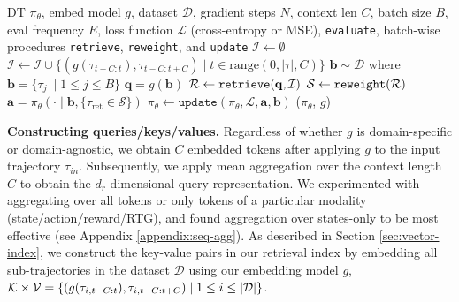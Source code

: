 \documentclass{article}
\newcommand{\cI}{\mathcal{I}} \newcommand{\cJ}{\mathcal{J}}
\newcommand{\cK}{\mathcal{K}} \newcommand{\cL}{\mathcal{L}}
\begin{document}
\begin{algorithm}[H]
\caption{RA-DT at training time}
\label{alg:radt-train}
  \begin{algorithmic}[1]
    \REQUIRE DT $\pi_{\theta}$, embed model $g$, dataset $\mathcal{D}$, gradient steps $N$, context len $C$, batch size $B$, eval frequency $E$, loss function $\mathcal{L}$ (cross-entropy or MSE), \texttt{evaluate}, batch-wise procedures \texttt{retrieve}, \texttt{reweight}, and \texttt{update}
    \STATE $\mathcal{I} \gets \emptyset$ \hfill{}
        \STATE $\mathcal{I} \gets \mathcal{I} \cup \{(g(\tau_{t-C:t}), \tau_{t-C:t+C}) \mid t \in \text{range}(0, |\tau|, C)\}$ \hfill\COMMENT{Add k-v pairs of sub-trjs to $\cI$ }
    \ENDFOR
        \STATE $\mathbf{b} \sim \mathcal{D}$ where $\mathbf{b}=\{\tau_j\ \mid 1 \leq j \leq B\} $ \hfill{}
        \STATE $\mathbf{q} = g(\mathbf{b})$ \hfill{}
        \STATE $\mathcal{R} \gets \text{\texttt{retrieve}}(\mathbf{q}, \mathcal{I})$ \hfill{}
        \STATE $\mathcal{S} \gets \text{\texttt{reweight}}(\mathcal{R})$ \hfill{}
        \STATE $\mathbf{a} = \pi_{\theta} (\cdot \mid \mathbf{b}, \{\tau_{\text{ret}} \in \mathcal{S}\} )$ \hfill{}
        \STATE $\pi_{\theta} \gets \texttt{update}(\pi_{\theta}, \mathcal{L}, \mathbf{a}, \mathbf{b})$ \hfill{}
            \STATE {}($\pi_{\theta}$, $g$) \hfill{}
        \ENDIF
    \ENDFOR
  \end{algorithmic}
\end{algorithm}
\textbf{Constructing queries/keys/values.}
Regardless of whether $g$ is domain-specific or domain-agnostic, we obtain $C$ embedded tokens after applying $g$ to the input trajectory $\tau_{in}$.
Subsequently, we apply mean aggregation over the context length $C$ to obtain the $d_r$-dimensional query representation.
We experimented with aggregating over all tokens or only tokens of a particular modality (state/action/reward/RTG), and found aggregation over states-only to be most effective (see Appendix \ref{appendix:seq-agg}).
As described in Section \ref{sec:vector-index}, we construct the key-value pairs in our retrieval index by embedding all sub-trajectories in the dataset $\mathcal{D}$ using our embedding model $g$, $\cK \times \cV = \{(g(\tau_{i, t-C:t}), \tau_{i, t-C:t+C}) \mid 1 \leq i \leq |\cD| \}$.
\end{document}
